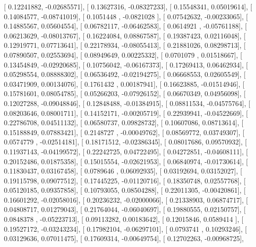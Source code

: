\documentclass{article}
\begin{document}
       [ 0.12241882, -0.02685571],
       [ 0.13627316, -0.08327233],
       [ 0.15548341,  0.05019614],
       [ 0.14084577, -0.08741019],
       [ 0.1051448 , -0.0821028 ],
       [ 0.07542632, -0.00233065],
       [ 0.14885567,  0.05604554],
       [ 0.06782117, -0.06462583],
       [ 0.0614921 , -0.05761188],
       [ 0.06213629, -0.08013767],
       [ 0.16224084,  0.08867587],
       [ 0.19387423,  0.02116048],
       [ 0.12919771,  0.07713641],
       [ 0.22178934, -0.08055413],
       [ 0.21881026,  0.08298713],
       [ 0.07890507,  0.02553694],
       [ 0.08949649,  0.00225332],
       [ 0.0701079 ,  0.01518667],
       [ 0.13454849, -0.02920685],
       [ 0.10756042, -0.06167373],
       [ 0.17269413,  0.06462934],
       [ 0.05298554,  0.08888302],
       [ 0.06536492, -0.02194275],
       [ 0.06668553,  0.02605549],
       [ 0.03471909,  0.00134076],
       [ 0.1761432 ,  0.00187941],
       [ 0.16623885, -0.01514946],
       [ 0.15781601,  0.08054785],
       [ 0.05266203, -0.07926152],
       [ 0.06670349,  0.04956098],
       [ 0.12027288, -0.09048846],
       [ 0.12848488, -0.01384915],
       [ 0.08811534, -0.04575764],
       [ 0.08203646,  0.08001711],
       [ 0.14152171, -0.00205719],
       [ 0.22939941, -0.04522669],
       [ 0.22786708,  0.04511132],
       [ 0.06580737,  0.09828732],
       [ 0.10607086,  0.08713614],
       [ 0.15188849,  0.07883421],
       [ 0.2148727 , -0.00049762],
       [ 0.08569772,  0.03749307],
       [ 0.0574779 , -0.02514181],
       [ 0.18171512, -0.02386345],
       [ 0.08017686,  0.09570932],
       [ 0.11937143, -0.04199572],
       [ 0.22242725,  0.04722495],
       [ 0.04272851, -0.04608111],
       [ 0.20152486,  0.01875358],
       [ 0.15015554, -0.02621953],
       [ 0.06840974, -0.01730614],
       [ 0.11830437,  0.03167458],
       [ 0.0789646 ,  0.06092935],
       [ 0.03192694,  0.03152027],
       [ 0.19115798,  0.09077512],
       [ 0.17445225, -0.01120716],
       [ 0.18350748,  0.02557768],
       [ 0.05120185,  0.09357858],
       [ 0.10793055,  0.08504288],
       [ 0.22011305, -0.00420861],
       [ 0.16601292, -0.02058016],
       [ 0.20236232, -0.02000066],
       [ 0.21338903,  0.06874717],
       [ 0.04808717,  0.01279043],
       [ 0.21764044, -0.06040697],
       [ 0.19880555,  0.02150757],
       [ 0.0848378 , -0.05223713],
       [ 0.09113282,  0.00183642],
       [ 0.12015846,  0.0589414 ],
       [ 0.19527172, -0.03243234],
       [ 0.17982104, -0.06297101],
       [ 0.0793741 ,  0.10293246],
       [ 0.03129636,  0.07011475],
       [ 0.17609314, -0.00649754],
       [ 0.12702263, -0.00968725],
\end{document}
